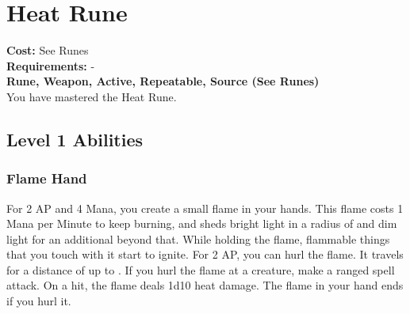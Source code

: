 \twocolumn
\section{Heat Rune}\label{rune:heat}
\textbf{Cost:} See Runes\\
\textbf{Requirements:} -\\
\textbf{Rune, Weapon, Active, Repeatable, Source (See Runes)}\\
You have mastered the Heat Rune.

\subsection{Level 1 Abilities}

\subsubsection{Flame Hand}
For 2 AP and 4 Mana, you create a small flame in your hands.
This flame costs 1 Mana per Minute to keep burning, and sheds bright light in a radius of  and dim light for an additional  beyond that.
While holding the flame, flammable things that you touch with it start to ignite.
For 2 AP, you can hurl the flame.
It travels for a distance of up to .
If you hurl the flame at a creature, make a ranged spell attack.
On a hit, the flame deals 1d10 heat damage.
The flame in your hand ends if you hurl it.